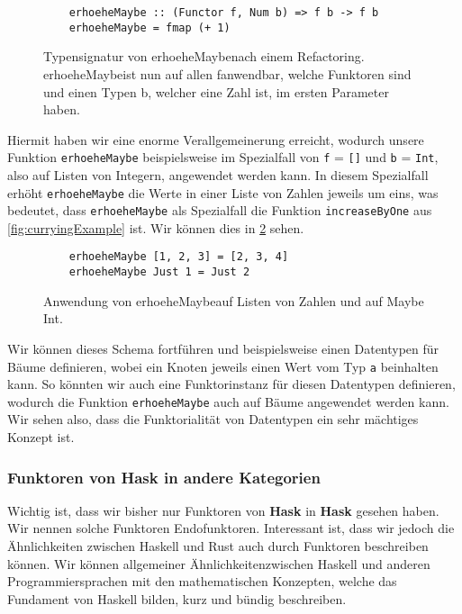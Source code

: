 \documentclass{hhuarticle}
\theoremstyle{definition}
\theoremstyle{theorem}
\begin{document}
  \begin{figure}[h]
    \begin{verbatim}
    erhoeheMaybe :: (Functor f, Num b) => f b -> f b
    erhoeheMaybe = fmap (+ 1)
    \end{verbatim}
    \caption{Typensignatur von \glqq erhoeheMaybe\grqq  nach einem Refactoring. \glqq erhoeheMaybe\grqq  ist nun auf allen \glqq f\grqq  anwendbar, welche Funktoren sind und einen Typen \glqq b\grqq , welcher eine Zahl ist, im ersten Parameter haben. }%
    \label{fig:maybeTypeAnwenden3}
  \end{figure}

  Hiermit haben wir eine enorme Verallgemeinerung erreicht, wodurch unsere
  Funktion \verb|erhoeheMaybe| beispielsweise im Spezialfall von \verb|f| = \verb|[]|
  und \verb|b| = \verb|Int|, also auf Listen von Integern, angewendet werden kann.
  In diesem Spezialfall erhöht \verb|erhoeheMaybe| die Werte in einer Liste von Zahlen
  jeweils um eins, was bedeutet, dass \verb|erhoeheMaybe| als Spezialfall
  die Funktion \verb|increaseByOne| aus \cref{fig:curryingExample} ist.
  Wir können dies in \cref{fig:maybeTypeAnwenden4} sehen.

  \begin{figure}[h]
    \begin{verbatim}
    erhoeheMaybe [1, 2, 3] = [2, 3, 4]
    erhoeheMaybe Just 1 = Just 2
    \end{verbatim}
    \caption{Anwendung von \glqq erhoeheMaybe\grqq  auf Listen von Zahlen und auf \glqq Maybe Int\grqq .}%
    \label{fig:maybeTypeAnwenden4}
  \end{figure}

  Wir können dieses Schema fortführen und beispielsweise einen Datentypen
  für Bäume definieren, wobei ein Knoten jeweils einen Wert vom Typ \verb|a|
  beinhalten kann. So könnten wir auch eine Funktorinstanz für diesen
  Datentypen definieren, wodurch die Funktion \verb|erhoeheMaybe| auch auf
  Bäume angewendet werden kann. Wir sehen also, dass die Funktorialität
  von Datentypen ein sehr mächtiges Konzept ist.

  \subsubsection{Funktoren von \textbf{Hask} in andere Kategorien}

  Wichtig ist, dass wir bisher nur Funktoren von \textbf{Hask} in \textbf{Hask}
  gesehen haben. Wir nennen solche Funktoren \glqq Endofunktoren\grqq .
  Interessant ist, dass wir jedoch die Ähnlichkeiten zwischen Haskell
  und Rust auch durch Funktoren beschreiben können. Wir können allgemeiner
  \glqq Ähnlichkeiten\grqq  zwischen Haskell und anderen Programmiersprachen
  mit den mathematischen Konzepten, welche das Fundament von Haskell
  bilden, kurz und bündig beschreiben.
\end{document}
